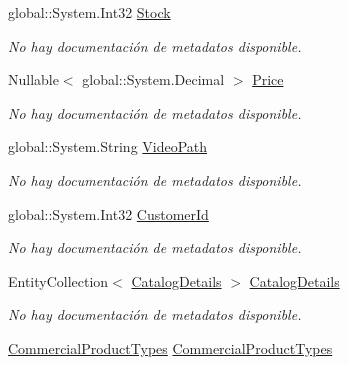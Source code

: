 \begin{DoxyCompactItemize}
global\-::\-System.\-Int32 \hyperlink{class_game_memory_1_1_commercial_products_a647e99bd36a3dc48c7b14fafc499f027}{Stock}
\begin{DoxyCompactList}\small\item\em No hay documentación de metadatos disponible. \end{DoxyCompactList}\item 
Nullable$<$ global\-::\-System.\-Decimal $>$ \hyperlink{class_game_memory_1_1_commercial_products_a7554ddad0d586549ac0902db89191c08}{Price}
\begin{DoxyCompactList}\small\item\em No hay documentación de metadatos disponible. \end{DoxyCompactList}\item 
global\-::\-System.\-String \hyperlink{class_game_memory_1_1_commercial_products_a62c8035a92098f4485b3aa532844cfed}{Video\-Path}
\begin{DoxyCompactList}\small\item\em No hay documentación de metadatos disponible. \end{DoxyCompactList}\item 
global\-::\-System.\-Int32 \hyperlink{class_game_memory_1_1_commercial_products_a25aeb7ff0bac027b1bb5a3a20e359468}{Customer\-Id}
\begin{DoxyCompactList}\small\item\em No hay documentación de metadatos disponible. \end{DoxyCompactList}\item 
Entity\-Collection$<$ \hyperlink{class_game_memory_1_1_catalog_details}{Catalog\-Details} $>$ \hyperlink{class_game_memory_1_1_commercial_products_ab0650a7e2dfc5f0258442cced8adb818}{Catalog\-Details}
\begin{DoxyCompactList}\small\item\em No hay documentación de metadatos disponible. \end{DoxyCompactList}\item 
\hyperlink{class_game_memory_1_1_commercial_product_types}{Commercial\-Product\-Types} \hyperlink{class_game_memory_1_1_commercial_products_ac5813dda9f061765d3f1aacb9dda00bf}{Commercial\-Product\-Types}

\end{DoxyCompactItemize}
